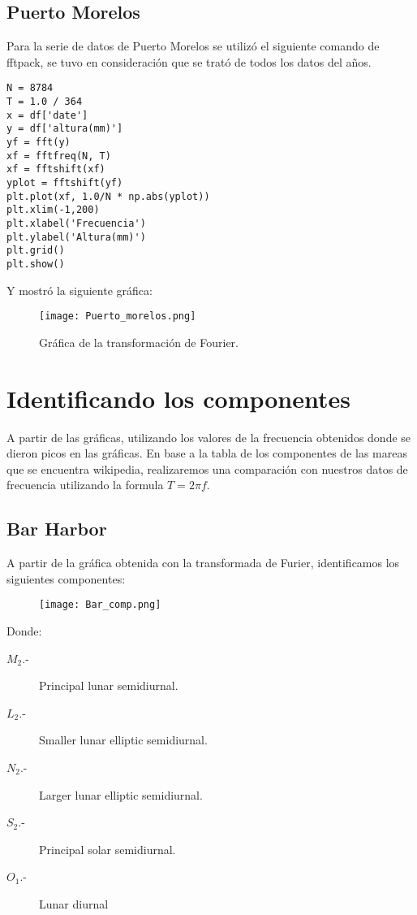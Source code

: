 \documentclass{article}
\begin{document}
\subsection{Puerto Morelos}
Para la serie de datos de Puerto Morelos se utilizó el siguiente comando de fftpack, se tuvo en consideración que se trató de todos los datos del años.
\begin{verbatim}
N = 8784
T = 1.0 / 364
x = df['date']
y = df['altura(mm)']
yf = fft(y)
xf = fftfreq(N, T)
xf = fftshift(xf)
yplot = fftshift(yf)
plt.plot(xf, 1.0/N * np.abs(yplot))
plt.xlim(-1,200)
plt.xlabel('Frecuencia')
plt.ylabel('Altura(mm)')
plt.grid()
plt.show()
\end{verbatim}
\pagebreak
Y mostró la siguiente gráfica:
\begin{figure}[h]
\centering
\texttt{[image: Puerto\_morelos.png]}
\caption{Gráfica de la transformación de Fourier.}
\end{figure}

\section{Identificando los componentes}
A partir de las gráficas, utilizando los valores de la frecuencia obtenidos donde se dieron picos en las gráficas. En base a la tabla de los componentes de las mareas que se encuentra wikipedia, realizaremos una comparación con nuestros datos de frecuencia utilizando la formula $T=2\pi f$.\\

\subsection{Bar Harbor}
A partir de la gráfica obtenida con la transformada de Furier, identificamos los siguientes componentes:\\
\begin{figure}[h]
\texttt{[image: Bar\_comp.png]}
\end{figure}
Donde:
\begin{description}
\item[$M_2$.-] Principal lunar semidiurnal.
\item[$L_2$.-] Smaller lunar elliptic semidiurnal.
\item[$N_2$.-] Larger lunar elliptic semidiurnal.
\item[$S_2$.-] Principal solar semidiurnal.
\item[$O_1$.-] Lunar diurnal
\end{description}
\end{document}
